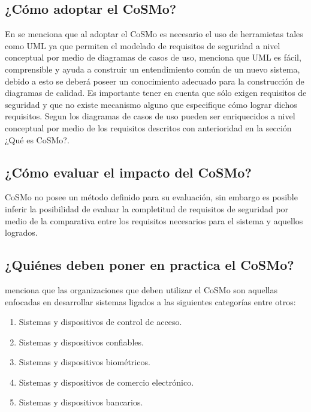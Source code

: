 \documentclass[runningheads,a4paper]{llncs}
\begin{document}
\subsection{¿Cómo adoptar el \gls{CoSMo}?}
En \cite{CoSMoIntroduction} se menciona que al adoptar el \gls{CoSMo} es necesario el uso de herramietas tales como \gls{UML} ya que permiten el modelado de requisitos de seguridad a nivel conceptual por medio de  diagramas de casos de uso, \cite{CoSMoIntroduction} menciona que \gls{UML} es fácil, comprensible y ayuda a construir un entendimiento común de un nuevo sistema, debido a esto se deberá poseer un conocimiento adecuado para la construcción de diagramas de calidad. Es importante tener en cuenta que sólo exigen requisitos de seguridad y que no existe mecanismo alguno que especifique cómo lograr dichos requisitos. Segun \cite{CoSMoIntroduction} los diagramas de casos de uso pueden ser enriquecidos a nivel conceptual por medio de los requisitos descritos con anterioridad en la sección ¿Qué es \gls{CoSMo}?.

\subsection{¿Cómo evaluar el impacto del \gls{CoSMo}?}
\gls{CoSMo} no posee un método definido para su evaluación, sin embargo es posible inferir la posibilidad de evaluar la completitud de requisitos de seguridad por medio de la comparativa entre los requisitos necesarios para el sistema y aquellos logrados.

\subsection{¿Quiénes deben poner en practica el \gls{CoSMo}?}
\cite{CoSMoIntroduction} menciona que las organizaciones que deben utilizar el \gls{CoSMo} son aquellas enfocadas en desarrollar sistemas ligados a las siguientes categorías entre otros:\\

\begin{enumerate}
	\item Sistemas y dispositivos de control de acceso.
	\item Sistemas y dispositivos confiables.
	\item Sistemas y dispositivos biométricos.
	\item Sistemas y dispositivos de comercio electrónico.
	\item Sistemas y dispositivos bancarios.
\end{enumerate}
\end{document}
